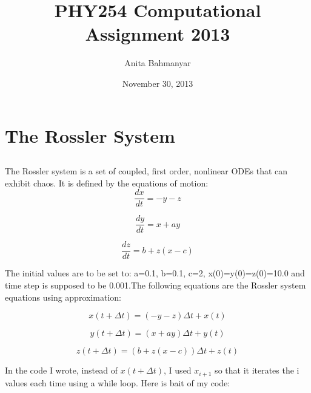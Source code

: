 \documentclass[letterpaper,12pt]{article}
\title{PHY254 Computational Assignment 2013}
\author{Anita Bahmanyar}
\date{November 30, 2013}
\begin{document}
\maketitle

\section{The Rossler System}
\label{sec:therosslersystem}

\subsection{}
The Rossler system is a set of coupled, first order, nonlinear ODEs that can exhibit chaos. It is defined by the equations of motion:
\begin{equation}
\frac{dx}{dt}=-y-z
\end{equation}

\begin{equation}
\frac{dy}{dt}=x+ay 
\end{equation}

\begin{equation}
\frac{dz}{dt}=b+ z(x-c)
\end{equation}

The initial values are to be set to:
a=0.1, b=0.1, c=2, x(0)=y(0)=z(0)=10.0 and time step is supposed to be 0.001.The following equations are the Rossler system equations using approximation:

\begin{equation}
x(t+\Delta t) = (-y-z)\Delta t +x(t)
\end{equation}

\begin{equation}
y(t+\Delta t) = (x+ay)\Delta t + y(t)
\end{equation}

\begin{equation}
z(t+\Delta t) = (b+z(x-c))\Delta t + z(t)
\end{equation}

In the code I wrote, instead of \begin{math} x(t+\Delta t) \end{math}, I used \begin{math} x_{i+1} \end{math} so that it iterates the i values each time using a while loop. Here is bait of my code:
\end{document}
